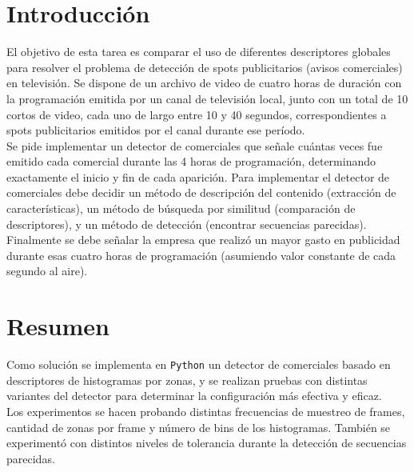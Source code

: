 \documentclass[14pt,letterpaper,hidelinks]{extarticle}
\begin{document}

\renewcommand{\sectionmark}[1]{\markright{\thesection.\ #1}}
\renewcommand{\headrulewidth}{0.5pt}

%
\tableofcontents
\listoffigures
\listoftables

\newpage
\section{Introducción}
El objetivo de esta tarea es comparar el uso de diferentes descriptores globales para resolver el problema de detección de spots publicitarios (avisos comerciales) en televisión. 
Se dispone de un archivo de video de cuatro horas de duración con la programación emitida por un canal de televisión local, junto con un total de 10 cortos de video, cada uno de largo entre 10 y 40 segundos, correspondientes a spots publicitarios emitidos por el canal durante ese período.\\

Se pide implementar un detector de comerciales que señale cuántas veces fue emitido cada comercial durante las 4 horas de programación, determinando exactamente el inicio y
fin de cada aparición. Para implementar el detector de comerciales debe decidir un método de 
descripción del contenido (extracción de características), un método de búsqueda
por similitud (comparación de descriptores), y un método de detección (encontrar
secuencias parecidas).\\

Finalmente se debe señalar la empresa que realizó un mayor gasto en publicidad durante esas cuatro horas de programación (asumiendo valor constante de cada segundo al aire).  
\section{Resumen}
Como solución se implementa en \verb+Python+ un detector de comerciales basado en descriptores de histogramas por zonas, y se realizan pruebas con distintas variantes del detector para determinar la configuración más efectiva y eficaz.\\

Los experimentos se hacen probando distintas frecuencias de muestreo de frames, cantidad de zonas por frame
y número de bins de los histogramas. También se experimentó con distintos niveles de tolerancia durante la detección de secuencias parecidas.\\
\end{document}
